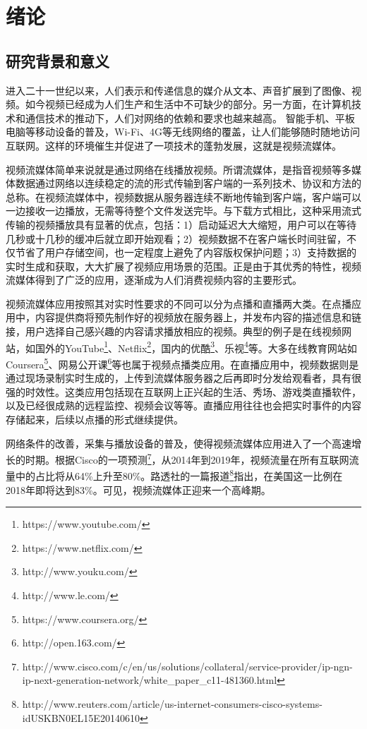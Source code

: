 \chapter{绪论}

\section{研究背景和意义}

进入二十一世纪以来，人们表示和传递信息的媒介从文本、声音扩展到了图像、视频。如今视频已经成为人们生产和生活中不可缺少的部分。另一方面，在计算机技术和通信技术的推动下，人们对网络的依赖和要求也越来越高。
智能手机、平板电脑等移动设备的普及，Wi-Fi、4G等无线网络的覆盖，让人们能够随时随地访问互联网。这样的环境催生并促进了一项技术的蓬勃发展，这就是视频流媒体。

视频流媒体简单来说就是通过网络在线播放视频。所谓流媒体，是指音视频等多媒体数据通过网络以连续稳定的流的形式传输到客户端的一系列技术、协议和方法的总称。在视频流媒体中，视频数据从服务器连续不断地传输到客户端，客户端可以一边接收一边播放，无需等待整个文件发送完毕。与下载方式相比，这种采用流式传输的视频播放具有显著的优点\supercite{Li2002}，包括：1）启动延迟大大缩短，用户可以在等待几秒或十几秒的缓冲后就立即开始观看；2）视频数据不在客户端长时间驻留，不仅节省了用户存储空间，也一定程度上避免了内容版权保护问题；3）支持数据的实时生成和获取，大大扩展了视频应用场景的范围。正是由于其优秀的特性，视频流媒体得到了广泛的应用，逐渐成为人们消费视频内容的主要形式\supercite{Chen2013}。

视频流媒体应用按照其对实时性要求的不同可以分为点播和直播两大类。在点播应用中，内容提供商将预先制作好的视频放在服务器上，并发布内容的描述信息和链接，用户选择自己感兴趣的内容请求播放相应的视频。典型的例子是在线视频网站，如国外的YouTube\footnote{https://www.youtube.com/}、Netflix\footnote{https://www.netflix.com/}，国内的优酷\footnote{http://www.youku.com/}、乐视\footnote{http://www.le.com/}等。大多在线教育网站如Coursera\footnote{https://www.coursera.org/}、网易公开课\footnote{http://open.163.com/}等也属于视频点播类应用。在直播应用中，视频数据则是通过现场录制实时生成的，上传到流媒体服务器之后再即时分发给观看者，具有很强的时效性。这类应用包括现在互联网上正兴起的生活、秀场、游戏类直播软件，以及已经很成熟的远程监控、视频会议等等。直播应用往往也会把实时事件的内容存储起来，后续以点播的形式继续提供。

网络条件的改善，采集与播放设备的普及，使得视频流媒体应用进入了一个高速增长的时期。根据Cisco的一项预测\footnote{http://www.cisco.com/c/en/us/solutions/collateral/service-provider/ip-ngn-ip-next-generation-network/white\_paper\_c11-481360.html}，从2014年到2019年，视频流量在所有互联网流量中的占比将从64\%上升至80\%。路透社的一篇报道\footnote{http://www.reuters.com/article/us-internet-consumers-cisco-systems-idUSKBN0EL15E20140610}指出，在美国这一比例在2018年即将达到83\%。可见，视频流媒体正迎来一个高峰期。

